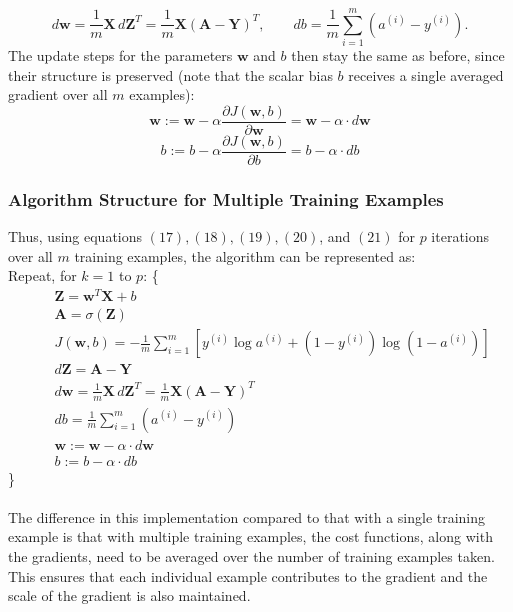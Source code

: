 \documentclass{article}
\begin{document}
$$d\mathbf{w} = \frac{1}{m}\mathbf{X}\,d\mathbf{Z}^T = \frac{1}{m}\mathbf{X}(\mathbf{A}-\mathbf{Y})^T, \qquad db = \frac{1}{m}\sum_{i=1}^{m}(a^{(i)}-y^{(i)}).$$
The update steps for the parameters $\mathbf{w}$ and $b$ then stay the same as before, since their structure is preserved (note that the scalar bias $b$ receives a single averaged gradient over all $m$ examples):
\begin{equation}
    \mathbf{w} := \mathbf{w} - \alpha \frac{\partial J(\mathbf{w}, b)}{\partial \mathbf{w}} = \mathbf{w} - \alpha \cdot d\mathbf{w}
\end{equation}
\begin{equation}
    b:=b-\alpha \frac{\partial J(\mathbf{w}, b)}{\partial b}=b - \alpha \cdot db
\end{equation}

\subsubsection{Algorithm Structure for Multiple Training Examples}

Thus, using equations $(17), (18), (19), (20)$, and $(21)$ for $p$ iterations over all $m$ training examples, the algorithm can be represented as:\\
Repeat, for $k=1$ to $p$: \{
\begin{align*}
    &\quad \mathbf{Z} = \mathbf{w}^T\mathbf{X} + b \\
    &\quad \mathbf{A}=\sigma(\mathbf{Z}) \\
    &\quad J(\mathbf{w},b)= -\frac{1}{m} \sum_{i=1}^{m}[y^{(i)}\log a^{(i)} + (1-y^{(i)})\log{(1-a^{(i)})}] \\
    &\quad d\mathbf{Z} = \mathbf{A}-\mathbf{Y} \\
    &\quad d\mathbf{w}=\frac{1}{m}\mathbf{X}\,d\mathbf{Z}^T = \frac{1}{m}\mathbf{X}(\mathbf{A}-\mathbf{Y})^T \\
    &\quad db=\frac{1}{m}\sum_{i=1}^{m}(a^{(i)}-y^{(i)}) \\
    &\quad \mathbf{w} := \mathbf{w} - \alpha \cdot d\mathbf{w} \\
    &\quad b:=b - \alpha \cdot db
\end{align*}
\}
\\
\\The difference in this implementation compared to that with a single training example is that with multiple training examples, the cost functions, along with the gradients, need to be averaged over the number of training examples taken. This ensures that each individual example contributes to the gradient and the scale of the gradient is also maintained.
\end{document}
